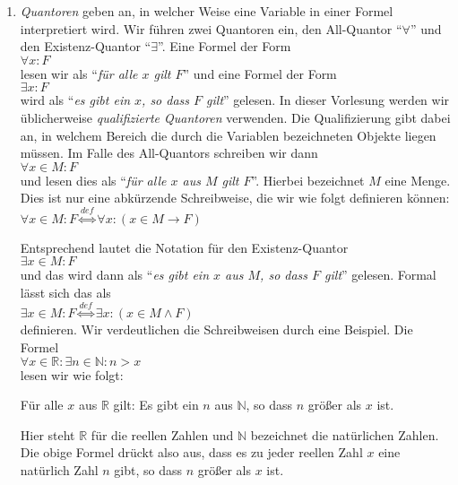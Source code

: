 \begin{enumerate}
\item \emph{Quantoren}
      geben an, in welcher Weise eine Variable in einer Formel interpretiert wird. 
      Wir führen zwei Quantoren ein, 
      den All-Quantor ``$\forall$'' und den Existenz-Quantor ``$\exists$''.  Eine Formel der Form\\[0.2cm]
      \hspace*{1.3cm} $\forall x: F$ \\[0.2cm]
      lesen wir als ``\emph{für alle $x$ gilt $F$}'' und eine Formel der Form \\[0.2cm]
      \hspace*{1.3cm} $\exists x: F$ \\[0.2cm]
      wird als ``\emph{es gibt ein $x$, so dass $F$ gilt}'' gelesen.  In dieser Vorlesung
      werden wir üblicherweise \emph{qualifizierte Quantoren} verwenden.  Die Qualifizierung
      gibt dabei an, in welchem Bereich die durch die Variablen bezeichneten Objekte liegen müssen.
      Im Falle des All-Quantors schreiben wir dann \\[0.2cm]
      \hspace*{1.3cm} $\forall x \in M: F$ \\[0.2cm]
      und lesen dies als ``\emph{für alle $x$ aus $M$ gilt $F$}''.  Hierbei bezeichnet $M$
      eine Menge. Dies ist nur eine abkürzende Schreibweise,
      die wir wie folgt definieren können: \\[0.2cm]
      \hspace*{1.3cm} $\forall x \in M: F \stackrel{de\!f}{\Longleftrightarrow} \forall x\colon (x\in M \rightarrow F)$ 

      Entsprechend
      lautet die Notation für den Existenz-Quantor \\[0.2cm]
      \hspace*{1.3cm}  $\exists x \in M: F$ \\[0.2cm]
      und das wird dann  als ``\emph{es gibt ein $x$ aus $M$, so dass $F$ gilt}'' gelesen.  
      Formal lässt sich das als \\[0.2cm]
      \hspace*{1.3cm} $\exists x \in M: F \stackrel{de\!f}{\Longleftrightarrow} \exists x\colon (x\in M \wedge F)$ \\[0.2cm]
      definieren.       Wir verdeutlichen die Schreibweisen durch eine Beispiel.  Die Formel \\[0.2cm]
      \hspace*{1.3cm} $\forall x \in \mathbb{R}: \exists n \in \mathbb{N} : n > x$ \\[0.2cm]
      lesen wir wie folgt:
      \begin{center}
        {\em
        \begin{minipage}{12cm}
          Für alle $x$ aus $\mathbb{R}$ gilt: Es gibt ein $n$ aus $\mathbb{N}$, so dass
          $n$ größer als $x$ ist.
        \end{minipage}
        }
      \end{center}
      Hier steht $\mathbb{R}$ für die reellen Zahlen und $\mathbb{N}$ bezeichnet die natürlichen Zahlen.
      Die obige Formel drückt also aus, dass es zu jeder reellen Zahl $x$ eine natürlich Zahl $n$ gibt, 
      so dass $n$ größer als $x$ ist.


\end{enumerate}
